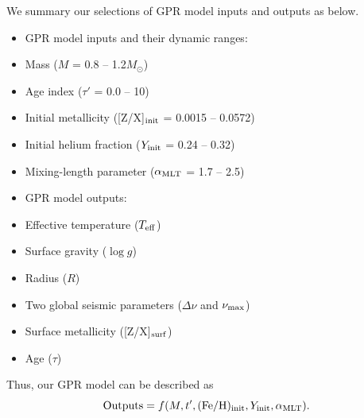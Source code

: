We summary our selections of GPR model inputs and outputs as below. 
\begin{itemize}
\item GPR model inputs and their dynamic ranges:
\item[] Mass ($M$ = 0.8 -- 1.2$M_{\odot}$)
\item[] Age index ($\tau'$ = 0.0 -- 10)
\item[] Initial metallicity ([Z/X]$_{\rm init}$ =  0.0015 -- 0.0572)
\item[] Initial helium fraction ($Y_{\rm init}$ = 0.24 -- 0.32)
\item[] Mixing-length parameter ($\alpha_{\rm MLT}$ = 1.7 -- 2.5)
\item GPR model outputs: 
\item[] Effective temperature ($T_{\rm eff}$) 
\item[] Surface gravity ($\log g$)
\item[] Radius ($R$)
\item[] Two global seismic parameters ($\Delta\nu$ and $\nu_{\rm max}$)  
\item[] Surface metallicity ([Z/X]$_{\rm surf}$)
\item[] Age ($\tau$)
\end{itemize}
Thus, our GPR model can be described as 
\begin{equation}\label{gprmodel}
{\rm Outputs} = f(M, t', ({\rm Fe/H})_{\rm init}, Y_{\rm init}, \alpha_{\rm MLT}). 
\end{equation}

